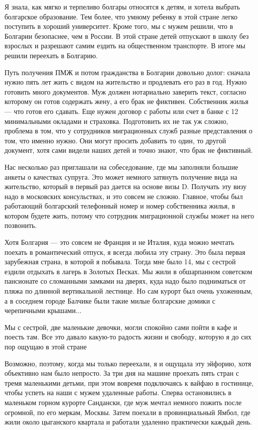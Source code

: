 Я знала, как мягко и терпеливо болгары относятся к детям, и хотела выбрать болгарское образование. Тем более, что умному ребенку в этой стране легко поступить в хороший университет. Кроме того, мы с мужем решили, что в Болгарии безопаснее, чем в России. В этой стране детей отпускают в школу без взрослых и разрешают самим ездить на общественном транспорте. В итоге мы решили переехать в Болгарию.

Путь получения ПМЖ и потом гражданства в Болгарии довольно долог: сначала нужно пять лет жить с видом на жительство и продлевать его раз в год. Нужно готовить много документов. Муж должен нотариально заверить текст, согласно которому он готов содержать жену, а его брак не фиктивен. Собственник жилья — что готов его сдавать. Еще нужен договор с работы или счет в банке с 12 минимальными окладами и страховка. Подготовить их не так уж сложно, проблема в том, что у сотрудников миграционных служб разные представления о том, что именно нужно. Они могут просить добавить то один, то другой документ, хотя сами видели наших детей и точно знают, что брак не фиктивный.

Нас несколько раз приглашали на собеседование, где мы заполняли большие анкеты о качествах супруга. Это может немного затянуть получение вида на жительство, который в первый раз дается на основе визы D. Получать эту визу надо в московских консульствах, и это совсем не сложно. Главное, чтобы был работающий болгарский телефонный номер и номер собственника жилья, в котором будете жить, потому что сотрудник миграционной службы может на него позвонить.

Хотя Болгария — это совсем не Франция и не Италия, куда можно мечтать поехать в романтический отпуск, я всегда любила эту страну. Это была первая зарубежная страна, в которой я побывала. Тогда мне было 14, мы с сестрой ездили отдыхать в лагерь в Золотых Песках. Мы жили в обшарпанном советском пансионате со сломанными замками на дверях, куда надо было подниматься от пляжа по длинной вертикальной лестнице. Но сам курорт был очень ухоженным, а в соседнем городе Балчике были такие милые болгарские домики с черепичными крышами...

\begin{fancyquotes}
    Мы с сестрой, две маленькие девочки, могли спокойно сами пойти в кафе и поесть там. Все это давало какую-то радость жизни и свободу, которую я до сих пор ощущаю в этой стране
\end{fancyquotes}

Возможно, поэтому, когда мы только переехали, я и ощущала эту эйфорию, хотя объективно нам было непросто. За три дня на машине проехать пять стран с тремя маленькими детьми, при этом вовремя подключаясь к вайфаю в гостинице, чтобы успеть на наши с мужем удаленные работы. Сперва остановились в маленьком горном курорте Сандански, где муж мечтал немного пожить после огромной, по его меркам, Москвы. Затем поехали в провинциальный Ямбол, где жили около цыганского квартала и работали удаленно практически каждый день.


